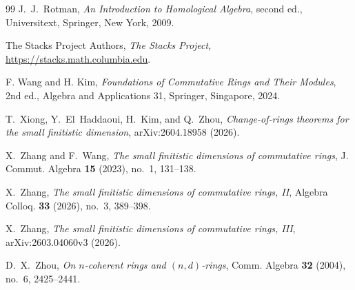 \documentclass[11pt]{amsart}
\numberwithin{equation}{section}
\theoremstyle{definition}
\theoremstyle{remark}
\begin{document}
\begin{thebibliography}{99}
J.~J.~Rotman,
\emph{An Introduction to Homological Algebra}, second ed.,
Universitext, Springer, New York, 2009.

The Stacks Project Authors,
\emph{The Stacks Project},
\url{https://stacks.math.columbia.edu}.

F. Wang and H. Kim,
\emph{Foundations of Commutative Rings and Their Modules}, 2nd ed.,
Algebra and Applications 31, Springer, Singapore, 2024.

T.~Xiong, Y.~El~Haddaoui, H.~Kim, and Q.~Zhou,
\emph{Change-of-rings theorems for the small finitistic dimension},
arXiv:2604.18958 (2026).

X.~Zhang and F.~Wang,
\emph{The small finitistic dimensions of commutative rings},
J. Commut. Algebra \textbf{15} (2023), no.~1, 131--138.

X.~Zhang,
\emph{The small finitistic dimensions of commutative rings, II},
Algebra Colloq. \textbf{33} (2026), no.~3, 389--398.

X.~Zhang,
\emph{The small finitistic dimensions of commutative rings, III},
arXiv:2603.04060v3 (2026).

D.~X.~Zhou,
\emph{On $n$-coherent rings and $(n,d)$-rings},
Comm. Algebra \textbf{32} (2004), no.~6, 2425--2441.

\end{thebibliography}
\end{document}
